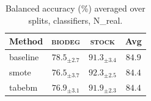 \begin{table}[t]
\centering
\caption{Balanced accuracy (\%) averaged over splits, classifiers, N\_real.}
\label{tab:main}
\begin{tabular}{lccc}
\toprule
Method & \textsc{biodeg} & \textsc{stock} & Avg \\
\midrule
baseline & $78.5_{\pm 2.7}$ & $91.3_{\pm 3.4}$ & $84.9$ \\
smote & $76.5_{\pm 3.7}$ & $92.3_{\pm 2.5}$ & $84.4$ \\
tabebm & $76.9_{\pm 3.1}$ & $91.9_{\pm 2.3}$ & $84.4$ \\
\bottomrule
\end{tabular}
\end{table}